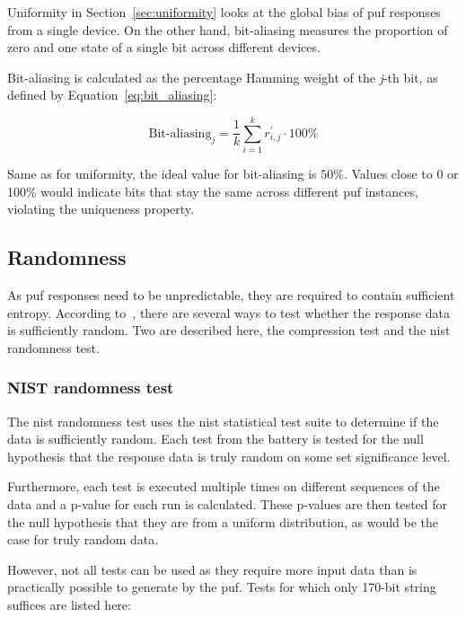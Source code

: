 Uniformity in Section~\ref{sec:uniformity} looks at the global bias of \gls{puf} responses from a single device. On the other hand, bit-aliasing measures the proportion of zero and one state of a single bit across different devices.

Bit-aliasing is calculated as the percentage Hamming weight of the \emph{j}-th bit, as defined by Equation~\ref{eq:bit_aliasing}:

\begin{equation}\label{eq:bit_aliasing}
    \textrm{Bit-aliasing}_{j} = \frac{1}{k}\sum_{i=1}^{k}r_{i, j}^{'} \cdot 100\%
\end{equation}

Same as for uniformity, the ideal value for bit-aliasing is $50\%$. Values close to 0 or 100\% would indicate bits that stay the same across different \gls{puf} instances, violating the uniqueness property.

\subsection{Randomness}

As \gls{puf} responses need to be unpredictable, they are required to contain sufficient entropy. According to~\cite{Leest2010}, there are several ways to test whether the response data is sufficiently random. Two are described here, the compression test and the \acrshort{nist} randomness test.

\subsubsection*{NIST randomness test}

The \acrshort{nist} randomness test uses the \acrshort{nist} statistical test suite to determine if the data is sufficiently random. Each test from the battery is tested for the null hypothesis that the response data is truly random on some set significance level.

Furthermore, each test is executed multiple times on different sequences of the data and a p-value for each run is calculated. These p-values are then tested for the null hypothesis that they are from a uniform distribution, as would be the case for truly random data.\cite{NIST2010}

However, not all tests can be used as they require more input data than is practically possible to generate by the \gls{puf}. Tests for which only 170-bit string suffices are listed here\cite{Leest2010}:

